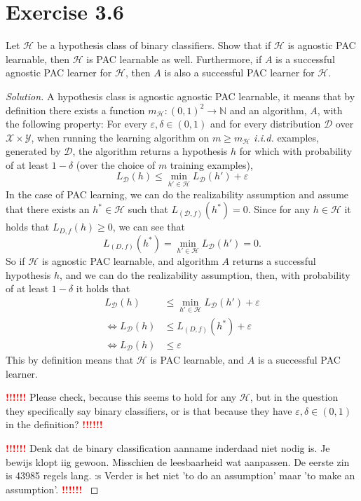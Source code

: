 \documentclass[10pt, a4paper, twoside]{amsart}
\newcommand{\N}{\ensuremath{\mathbb{N}}}
\newenvironment{solution}
               {\let\oldqedsymbol=\qedsymbol
                \renewcommand{\qedsymbol}{$\blacktriangleleft$}
                \begin{proof}[Solution]}
               {\end{proof}
                \renewcommand{\qedsymbol}{\oldqedsymbol}}
\newcommand{\TODO}{\textcolor{red}{\textbf{!!!!!! }}}
\begin{document}
\section*{Exercise 3.6}
Let $\mathcal{H}$ be a hypothesis class of binary classifiers. Show that if $\mathcal{H}$ is agnostic PAC learnable, then $\mathcal{H}$ is PAC learnable as well.
Furthermore, if $A$ is a successful agnostic PAC learner for $\mathcal{H}$, then $A$ is also a successful PAC learner for $\mathcal{H}$.
\begin{solution}
  A hypothesis class is agnostic agnostic  PAC learnable, it means that by definition there exists a function $m_{\mathcal{H}}:(0,1)^2\to \N$ and an algorithm, $A$, with the following property: For every $\varepsilon, \delta \in (0,1)$ and for every distribution $\mathcal{D}$ over $\mathcal{X} \times \mathcal{Y}$, when running the learning algorithm on $m\geq m_{\mathcal{H}}$ \textit{i.i.d.} examples, generated by $\mathcal{D}$, the algorithm returns a hypothesis $h$ for which with probability of at least $1-\delta$ (over the choice of $m$ training examples),
  \begin{equation*}
    L_{\mathcal{D}}(h) \leq \min_{h' \in \mathcal{H}}L_{\mathcal{D}}(h')+\varepsilon
  \end{equation*}
  In the case of PAC learning, we can do the realizability assumption and assume that there exists an $h^* \in \mathcal{H}$ such that $L_{(\mathcal{D},f)}(h^*) = 0$. Since for any $h \in \mathcal{H}$ it holds that $L_{D,f}(h) \geq 0$, we can see that
  \begin{equation*}
    L_{(D,f)}(h^*) = \min_{h' \in \mathcal{H}}L_{\mathcal{D}}(h') =0.
  \end{equation*}
  So if $\mathcal{H}$ is agnostic PAC learnable, and algorithm $A$ returns a successful hypothesis $h$, and we can do the realizability assumption, then, with probability of at least $1-\delta$ it holds that
  \begin{align*}
    L_{\mathcal{D}}(h) &\leq \min_{h' \in \mathcal{H}}L_{\mathcal{D}}(h')+\varepsilon \\
    \iff L_{\mathcal{D}}(h) &\leq  L_{(D,f)}(h^*) + \varepsilon \\
    \iff L_{\mathcal{D}}(h) &\leq  \varepsilon
  \end{align*}
  This by definition means that $\mathcal{H}$ is PAC learnable, and $A$ is a successful PAC learner.
    
  \TODO Please check, because this seems to hold for any $\mathcal{H}$, but in the question they specifically say binary classifiers, or is that because they have $\varepsilon, \delta \in (0,1)$ in the definition? \TODO
  
  \TODO Denk dat de binary classification aanname inderdaad niet nodig is. Je bewijs klopt iig gewoon. Misschien de leesbaarheid wat aanpassen. De eerste zin is 43985 regels lang. :s Verder is het niet 'to do an assumption' maar 'to make an assumption'. \TODO
\end{solution}
\end{document}
